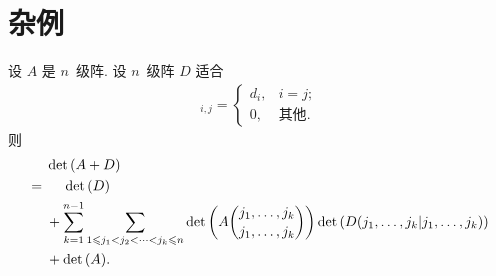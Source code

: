 \section{杂例}

\begin{example}
    设 \(A\) 是 \(n\)~级阵.
    设 \(n\)~级阵 \(D\) 适合
    \begin{align*}
        [D]_{i,j}
        = \begin{cases}
              d_i, & i = j;     \\
              0,   & \text{其他}.
          \end{cases}
    \end{align*}
    则
    \begin{align*}
             &
        \det {(A + D)}
        \\
        = {} &
        \hphantom{{} + {}}
        \det {(D)}
        \\
             &
        + \sum_{k = 1}^{n-1}
        {
        \sum_{1 \leq j_1 < j_2 < \dots < j_k \leq n}
        \det {\left(
            A\binom{j_1,\dots,j_k}{j_1,\dots,j_k}
            \right)}
        \det {(D({j_1,\dots,j_k}|{j_1,\dots,j_k}))}
        }
        \\
             &
        + \det {(A)}.
    \end{align*}


\end{example}
